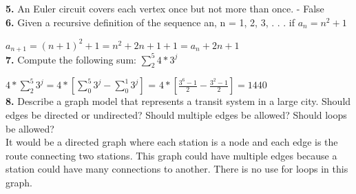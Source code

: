 \documentclass{article}
\begin{document}
\textbf{5.}  An Euler circuit covers each vertex once but not more than once. - False\\

\textbf{6.} Given a recursive deﬁnition of the sequence {an}, n = 1, 2, 3, . . . if
$a_n = n^2 + 1$

$a_{n+1} = (n+1)^2+1 = n^2+2n+1+1 = a_n+2n+1$\\

\textbf{7.} Compute the following sum: $\sum_{2}^5 4*3^j$

$4*\sum_{2}^5 3^j = 4*[\sum_{0}^5 3^j - \sum_{0}^1 3^j]$ = $4*[\frac{3^6-1}{2} - \frac{3^2-1}{2}] = 1440$\\

\textbf{8.} Describe a graph model that represents a transit system in a large city. Should edges be directed or undirected? Should multiple edges be allowed? Should loops be allowed?\\

It would be a directed graph where each station is a node and each edge is the route connecting two stations. This graph could have multiple edges because a station could have many connections to another.  There is no use for loops in this graph. 
\end{document}
